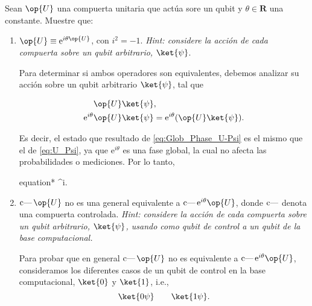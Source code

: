 \documentclass[./../main.tex]{subfiles}
\begin{document}
\section{}

Sean \(\op{U}\) una compuerta unitaria que actúa sore un qubit y \(\theta\in\bm{R}\) una constante. Muestre que:
\begin{enumerate}
	\item \(\op{U} \equiv \textrm{e}^{i\theta\op{U}}\), con \(i^{2} = -1\). \emph{Hint: considere la acción de cada compuerta sobre un qubit arbitrario, \(\ket{\psi}\)}.

	      \startsolution

	      Para determinar si ambos operadores son equivalentes, debemos analizar su acción sobre un qubit arbitrario \(\ket{\psi}\), tal que

	      \begin{align}
		      \op{U}\ket{\psi}                     & ,\label{eq:U_Psi}                                                    \\
		      \mathrm{e}^{i\theta}\op{U}\ket{\psi} & = \mathrm{e}^{i\theta}(\op{U}\ket{\psi}).\label{eq:Glob_Phase_U-Psi}
	      \end{align}

	      Es decir, el estado que resultado de \cref{eq:Glob_Phase_U-Psi} es el mismo que el de \cref{eq:U_Psi}, ya que \(\mathrm{e}^{i\theta}\) es una fase global, la cual no afecta las probabilidades o mediciones. Por lo tanto,

	      \begin{empheq}[box=\mainresult]{equation*}
		       \equiv {}^{i\theta}.
	      \end{empheq}

	      \pagebreak
	\item \(\cnot\op{U}\) no es una general equivalente a \(\cnot\textrm{e}^{i\theta}\op{U}\), donde \(\operatorname{c\text{---}}\) denota una compuerta controlada. \emph{Hint: considere la acción de cada compuerta sobre un qubit arbitrario, \(\ket{\psi}\), usando como qubit de control a un qubit de la base computacional.}

	      \startsolution
	      Para probar que en general \(\cnot\op{U}\) no es equivalente a \(\cnot\mathrm{e}^{i\theta}\op{U}\), consideramos los diferentes casos de un qubit de control en la base computacional, \(\ket{0}\) y \(\ket{1}\), i.e.,
	      \begin{equation*}
		      \ket{0\psi} \qquad \ket{1\psi}.
	      \end{equation*}


\end{enumerate}
\end{document}

